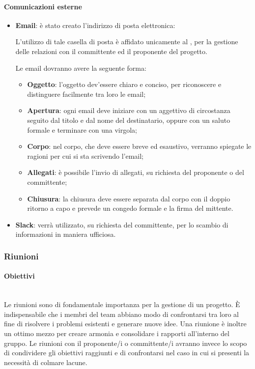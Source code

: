 \paragraph{Comunicazioni esterne}
\begin{itemize}
\item\textbf{Email}: è stato creato l'indirizzo di posta elettronica:
\textbf{\emailgruppo}

L'utilizzo di tale casella di posta è affidato unicamente al \RdP, per la gestione delle relazioni con il committente ed il  proponente del progetto.

Le email dovranno avere la seguente forma:
	\begin{itemize}
	\item\textbf{Oggetto}: l'oggetto dev'essere chiaro e conciso, per riconoscere e distinguere facilmente tra loro le email;
	\item\textbf{Apertura}: ogni email deve iniziare con un aggettivo di circostanza seguito dal titolo e dal  nome del destinatario,  oppure con un saluto formale e terminare con una virgola;
	\item\textbf{Corpo}: nel corpo, che deve essere breve ed esaustivo, verranno spiegate le ragioni per cui si sta scrivendo l'email;
	\item\textbf{Allegati}: è possibile l'invio di allegati, su richiesta del proponente o del committente;
	\item\textbf{Chiusura}: la chiusura deve essere separata dal corpo con il doppio ritorno a capo e prevede un congedo formale e la firma del mittente.
	\end{itemize}

\item\textbf{Slack}: verrà utilizzato, su richiesta del committente, per lo scambio di informazioni in maniera ufficiosa.
\end{itemize}

\subsubsection{Riunioni}
\paragraph{Obiettivi}
~\\Le riunioni sono di fondamentale importanza per la gestione di un progetto. È indispensabile che i membri del team abbiano
modo di confrontarsi tra loro al fine di risolvere i problemi esistenti e generare nuove idee. Una riunione è inoltre un
ottimo mezzo per creare armonia e consolidare i rapporti all'interno del gruppo. Le riunioni con il proponente/i o committente/i avranno invece lo scopo di condividere gli obiettivi raggiunti e di confrontarsi nel caso in cui si presenti
la necessità di colmare lacune. 
